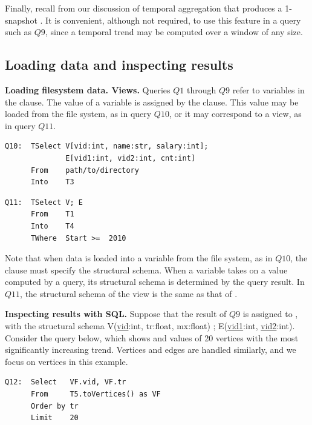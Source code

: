 Finally, recall from our discussion of temporal aggregation that
 produces a 1-snapshot \tg.  It is convenient,
although not required, to use this feature in a query such as $Q9$,
since a temporal trend may be computed over a window of any size.

\subsection{Loading data and inspecting results}
\label{sec:example:loadshow}

{\bf Loading filesystem data.  Views.}  Queries $Q1$ through $Q9$
refer to \tg variables in the  clause.  The value of a \tg
variable is assigned by the  clause.  This value may be
loaded from the file system, as in query $Q10$, or it may correspond to
a view, as in query $Q11$.

\begin{small}
\begin{verbatim}
Q10:  TSelect V[vid:int, name:str, salary:int]; 
              E[vid1:int, vid2:int, cnt:int]
      From    path/to/directory
      Into    T3
\end{verbatim}
\end{small}

\begin{small}
\begin{verbatim}
Q11:  TSelect V; E
      From    T1
      Into    T4
      TWhere  Start >=  2010 
\end{verbatim}
\end{small}

Note that when data is loaded into a \tg variable from the file
system, as in $Q10$, the  clause must specify the
structural schema.  When a \tg variable takes on a value computed by a
query, its structural schema is determined by the query result.  In
$Q11$, the structural schema of the view  is the same as
that of .

{\bf Inspecting results with SQL.}  Suppose that the result of $Q9$ is
assigned to , with the structural schema
V(\underline{vid}:int, tr:float, mx:float) ; E(\underline{vid1}:int,
\underline{vid2}:int).  Consider the  query below, which
shows  and  values of 20 vertices with the most
significantly increasing  trend.  Vertices and edges
are handled similarly, and we focus on vertices in this example. 

\begin{small}
\begin{verbatim}
Q12:  Select   VF.vid, VF.tr  
      From     T5.toVertices() as VF
      Order by tr
      Limit    20
\end{verbatim}
\end{small}

